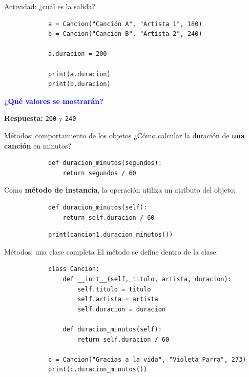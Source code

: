 \documentclass{beamer}
\begin{document}
    \begin{frame}[fragile,t]{Actividad: ¿cuál es la salida?}
        \begin{verbatim}
            a = Cancion("Canción A", "Artista 1", 180)
            b = Cancion("Canción B", "Artista 2", 240)
            
            a.duracion = 200
            
            print(a.duracion)
            print(b.duracion)
        \end{verbatim}
        \pause
        \textcolor{blue}{\textbf{¿Qué valores se mostrarán?}}

        \pause
        \textbf{Respuesta:} \texttt{200} y \texttt{240}
    \end{frame}

    \begin{frame}[fragile,t]{Métodos: comportamiento de los objetos}
        ¿Cómo calcular la duración de \textbf{una canción} en minutos?
        \begin{verbatim}
            def duracion_minutos(segundos):
                return segundos / 60
        \end{verbatim}
        \pause
        Como \textbf{método de instancia}, la operación utiliza un atributo del objeto:
        \begin{verbatim}
            def duracion_minutos(self):
                return self.duracion / 60
        \end{verbatim}
        \pause
        \begin{verbatim}
            print(cancion1.duracion_minutos())
        \end{verbatim}
    \end{frame}
    
    \begin{frame}[fragile,t]{Métodos: una clase completa}
        El método se define dentro de la clase:
        \begin{verbatim}
            class Cancion:
                def __init__(self, titulo, artista, duracion):
                    self.titulo = titulo
                    self.artista = artista
                    self.duracion = duracion
            
                def duracion_minutos(self):
                    return self.duracion / 60
            
            c = Cancion("Gracias a la vida", "Violeta Parra", 273)
            print(c.duracion_minutos())
        \end{verbatim}
    \end{frame}
    
\end{document}
